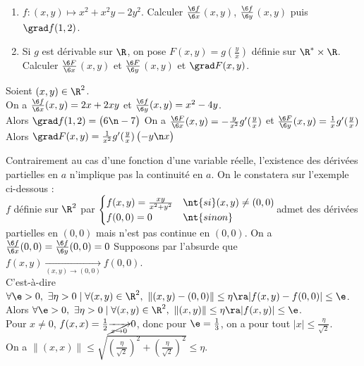 \documentclass[11pt]{article}
\begin{document}
\begin{ex}{}{}
    \begin{enumerate}[topsep=0pt,itemsep=-0.9 ex]
        \item $f:(x,y)\mapsto x^2+x^2y-2y^2$. Calculer \Large$\frac{\6 f}{\6 x}$\normalsize$(x,y)$, \Large$\frac{\6 f}{\6 y}$\normalsize$(x,y)$ puis $\grad f(1,2)$.
        \item Si $g$ est dérivable sur $\R$, on pose $F(x,y)=g$\Large$(\frac{y}{x})$ \normalsize définie sur $\R^*\times\R$.\\
        Calculer \Large$\frac{\6 F}{\6 x}$\normalsize$(x,y)$ et \Large$\frac{\6 F}{\6 y}$\normalsize$(x,y)$ et $\grad F(x,y)$.
    \end{enumerate}
    \tcblower
    Soient $(x,y)\in\R^2$.\\
    On a $\frac{\6 f}{\6 x}(x,y)=2x+2xy$ et $\frac{\6 f}{\6 y}(x,y)=x^2-4y$.\\
    Alors $\grad f(1,2) = \left(\begin{aligned}
        6\n
        -7
        \end{aligned}\right)$\n
    On a $\frac{\6 F}{\6 x}(x,y)=-\frac{y}{x^2}g'(\frac{y}{x})$ et $\frac{\6 F}{\6 y}(x,y)=\frac{1}{x}g'(\frac{y}{x})$\\
    Alors $\grad F(x,y) = \frac{1}{x^2}g'(\frac{y}{x})\left(\begin{aligned}
        -y\n
        x
        \end{aligned}\right)$
\end{ex}

\begin{ex}{\warning}{}
    Contrairement au cas d'une fonction d'une variable réelle, l'existence des dérivées partielles en $a$ n'implique pas la continuité en $a$. On le constatera sur l'exemple ci-dessous :\\
    $f$ définie sur $\R^2$ par \large$\begin{cases}f(x,y)=\frac{xy}{x^2+y^2}&\nt{si } (x,y)\neq(0,0)\\f(0,0)=0 &\nt{sinon}\end{cases}$\normalsize admet des dérivées partielles en $(0,0)$ mais n'est pas continue en $(0,0)$.
    \tcblower
    On a $\frac{\6 f}{\6 x}(0,0)=\frac{\6 f}{\6 y}(0,0)=0$\n
    Supposons par l'absurde que $f(x,y)\xrightarrow[(x,y)\to(0,0)]{}{f(0,0)}$.\\
    C'est-à-dire $\forall \e>0, ~ \exists \eta>0 \mid \forall (x,y)\in\R^2, ~ \|(x,y)-(0,0)\|\leq\eta \ra |f(x,y)-f(0,0)|\leq\e$.\\
    Alors $\forall \e>0, ~ \exists\eta>0 \mid \forall (x,y)\in\R^2, ~ \|(x,y)\|\leq \eta \ra |f(x,y)|\leq \e$.\\
    Pour $x\neq0$, $f(x,x)=\frac{1}{2}\cancel{\xrightarrow[x\to0]{}}0$, donc pour $\e=\frac{1}{3}$, on a pour tout $|x|\leq\frac{\eta}{\sqrt{2}}$.\\
    On a $\|(x,x)\|\leq\sqrt{(\frac{\eta}{\sqrt{2}})^2+(\frac{\eta}{\sqrt{2}})^2}\leq\eta$.
\end{ex}
\end{document}
